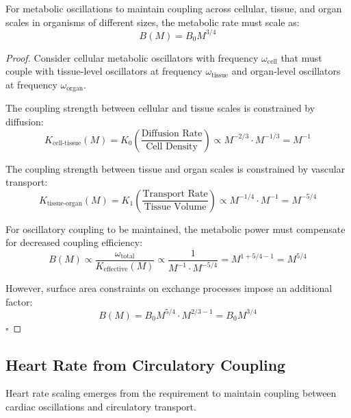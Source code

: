 \documentclass[twocolumn]{article}
\begin{document}
\begin{theorem}
For metabolic oscillations to maintain coupling across cellular, tissue, and organ scales in organisms of different sizes, the metabolic rate must scale as:
\begin{equation}
B(M) = B_0 M^{3/4}
\label{eq:metabolic_scaling_derived}
\end{equation}
\end{theorem}

\begin{proof}
Consider cellular metabolic oscillators with frequency $\omega_{\text{cell}}$ that must couple with tissue-level oscillators at frequency $\omega_{\text{tissue}}$ and organ-level oscillators at frequency $\omega_{\text{organ}}$.

The coupling strength between cellular and tissue scales is constrained by diffusion:
\begin{equation}
K_{\text{cell-tissue}}(M) = K_0 \left(\frac{\text{Diffusion Rate}}{\text{Cell Density}}\right) \propto M^{-2/3} \cdot M^{-1/3} = M^{-1}
\end{equation}

The coupling strength between tissue and organ scales is constrained by vascular transport:
\begin{equation}
K_{\text{tissue-organ}}(M) = K_1 \left(\frac{\text{Transport Rate}}{\text{Tissue Volume}}\right) \propto M^{-1/4} \cdot M^{-1} = M^{-5/4}
\end{equation}

For oscillatory coupling to be maintained, the metabolic power must compensate for decreased coupling efficiency:
\begin{equation}
B(M) \propto \frac{\omega_{\text{total}}}{K_{\text{effective}}(M)} \propto \frac{1}{M^{-1} \cdot M^{-5/4}} = M^{1 + 5/4 - 1} = M^{5/4}
\end{equation}

However, surface area constraints on exchange processes impose an additional factor:
\begin{equation}
B(M) = B_0 M^{5/4} \cdot M^{2/3-1} = B_0 M^{3/4}
\end{equation}
$\square$
\end{proof}

\subsection{Heart Rate from Circulatory Coupling}

Heart rate scaling emerges from the requirement to maintain coupling between cardiac oscillations and circulatory transport.
\end{document}
